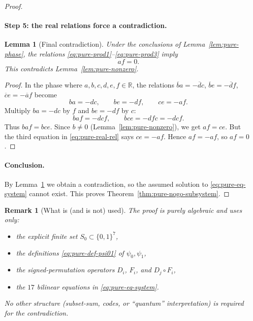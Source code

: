 \documentclass[11pt]{article}
\newtheorem{lemma}{Lemma}
\newtheorem{remark}{Remark}
\begin{document}
\begin{proof}
\paragraph{Step 5: the real relations force a contradiction.}

\begin{lemma}[Final contradiction]
\label{lem:pure-final}
Under the conclusions of Lemma~\ref{lem:pure-phase}, the relations \eqref{eq:pure-prod1}--\eqref{eq:pure-prod3} imply
\[
af=0.
\]
This contradicts Lemma~\ref{lem:pure-nonzero}.
\end{lemma}

\begin{proof}
In the phase where $a,b,c,d,e,f\in\mathbb R$, the relations
$\overline{b}a=-\overline{d}c$, $\overline{b}e=-\overline{d}f$, $\overline{c}e=-\overline{a}f$
become
\begin{equation}
ba=-dc,\qquad be=-df,\qquad ce=-af.
\label{eq:pure-real-rel}
\end{equation}
Multiply $ba=-dc$ by $f$ and $be=-df$ by $c$:
\[
baf=-dcf,\qquad bce=-dfc=-dcf.
\]
Thus $baf=bce$. Since $b\neq 0$ (Lemma~\ref{lem:pure-nonzero}), we get $af=ce$.
But the third equation in \eqref{eq:pure-real-rel} says $ce=-af$. Hence $af=-af$, so $af=0$.
\end{proof}

\paragraph{Conclusion.}
By Lemma~\ref{lem:pure-final} we obtain a contradiction, so the assumed solution to \eqref{eq:pure-eq-system} cannot exist.
This proves Theorem~\ref{thm:pure-nogo-subsystem}.
\end{proof}

\begin{remark}[What is (and is not) used]
The proof is purely algebraic and uses only:
\begin{itemize}
\item the explicit finite set $S_0\subset\{0,1\}^7$,
\item the definitions \eqref{eq:pure-def-psi01} of $\psi_0,\psi_1$,
\item the signed-permutation operators $D_i$, $F_i$, and $D_j\circ F_i$,
\item the $17$ bilinear equations in \eqref{eq:pure-eq-system}.
\end{itemize}
No other structure (subset-sum, codes, or ``quantum'' interpretation) is required for the contradiction.
\end{remark}
\end{document}
